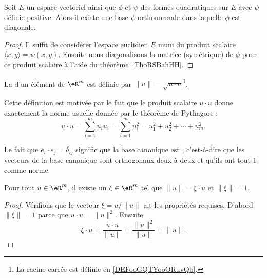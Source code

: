 \begin{corollary}   \label{CorSMHpoVK}
	Soit \( E\) un espace vectoriel ainsi que \( \phi\) et \( \psi\) des formes quadratiques sur \( E\) avec \( \psi\) définie positive. Alors il existe une base \( \psi\)-orthonormale dans laquelle \( \phi\) est diagonale.
\end{corollary}

\begin{proof}
	Il suffit de considérer l'espace euclidien \( E\) muni du produit scalaire \( \langle x, y\rangle =\psi(x,y)\). Ensuite nous diagonalisons la matrice (symétrique) de \( \phi\) pour ce produit scalaire à l'aide du théorème~\ref{ThoRSBahHH}.
\end{proof}

\begin{definition}      \label{DefNormeEucleApp}
	La  d'un élément de \( \eR^m\) est définie par \( \| u \|=\sqrt{u\cdot u}\)\footnote{La racine carrée est définie en \ref{DEFooGQTYooORuvQb}.}.
\end{definition}

Cette définition est motivée par le fait que le produit scalaire \( u\cdot u\) donne exactement la norme usuelle donnée par le théorème de Pythagore :
\begin{equation}
	u\cdot u=\sum_{i=1}^mu_iu_i=\sum_{i=1}^m u_i^2=u_1^2+u_2^2+\cdots+u_m^2.
\end{equation}

Le fait que \( e_i\cdot e_j=\delta_{ij}\) signifie que la base canonique est , c'est-à-dire que les vecteurs de la base canonique sont orthogonaux deux à deux et qu'ils ont tout \( 1\) comme norme.

\begin{lemma}\label{LemSclNormeXi}
	Pour tout \( u\in\eR^m\), il existe un \( \xi\in\eR^m\) tel que \( \| u \|=\xi\cdot u\) et \( \| \xi \|=1\).
\end{lemma}

\begin{proof}
	Vérifions que le vecteur \( \xi=u/\| u \|\) ait les propriétés requises. D'abord \( \| \xi \|=1\) parce que \( u\cdot u=\| u \|^2\). Ensuite
	\begin{equation}
		\xi\cdot u=\frac{ u\cdot u }{ \| u \| }=\frac{ \| u \|^2 }{ \| u \| }=\| u \|.
	\end{equation}
\end{proof}


